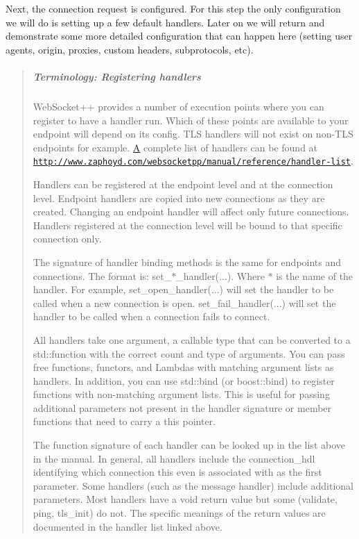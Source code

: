 Next, the connection request is configured. For this step the only configuration we will do is setting up a few default handlers. Later on we will return and demonstrate some more detailed configuration that can happen here (setting user agents, origin, proxies, custom headers, subprotocols, etc).

\begin{quote}
\subparagraph*{Terminology\+: Registering handlers}

Web\+Socket++ provides a number of execution points where you can register to have a handler run. Which of these points are available to your endpoint will depend on its config. T\+LS handlers will not exist on non-\/\+T\+LS endpoints for example. \mbox{\hyperlink{struct_a}{A}} complete list of handlers can be found at \href{http://www.zaphoyd.com/websocketpp/manual/reference/handler-list}{\tt http\+://www.\+zaphoyd.\+com/websocketpp/manual/reference/handler-\/list}.

Handlers can be registered at the endpoint level and at the connection level. Endpoint handlers are copied into new connections as they are created. Changing an endpoint handler will affect only future connections. Handlers registered at the connection level will be bound to that specific connection only.

The signature of handler binding methods is the same for endpoints and connections. The format is\+: {\ttfamily set\+\_\+$\ast$\+\_\+handler(...)}. Where $\ast$ is the name of the handler. For example, {\ttfamily set\+\_\+open\+\_\+handler(...)} will set the handler to be called when a new connection is open. {\ttfamily set\+\_\+fail\+\_\+handler(...)} will set the handler to be called when a connection fails to connect.

All handlers take one argument, a callable type that can be converted to a {\ttfamily std\+::function} with the correct count and type of arguments. You can pass free functions, functors, and Lambdas with matching argument lists as handlers. In addition, you can use {\ttfamily std\+::bind} (or {\ttfamily boost\+::bind}) to register functions with non-\/matching argument lists. This is useful for passing additional parameters not present in the handler signature or member functions that need to carry a \textquotesingle{}this\textquotesingle{} pointer.

The function signature of each handler can be looked up in the list above in the manual. In general, all handlers include the {\ttfamily connection\+\_\+hdl} identifying which connection this even is associated with as the first parameter. Some handlers (such as the message handler) include additional parameters. Most handlers have a void return value but some ({\ttfamily validate}, {\ttfamily ping}, {\ttfamily tls\+\_\+init}) do not. The specific meanings of the return values are documented in the handler list linked above. \end{quote}


